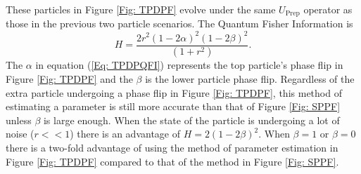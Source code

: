 \documentclass[twocolumn]{article}
\begin{document}
\newpage \par \noindent
These particles in Figure \ref{Fig: TPDPF} evolve under the same $U_{\text{Prep}}$ operator as those in the previous two particle scenarios. The Quantum Fisher Information is
\begin{equation}\label{Eq: TPDPQFI}
H=\frac{2r^2(1-2\alpha)^2(1-2\beta)^2}{(1+r^2)}.
\end{equation}
The $\alpha$ in equation (\ref{Eq: TPDPQFI}) represents the top particle's phase flip in Figure \ref{Fig: TPDPF} and the $\beta$ is the lower particle phase flip. Regardless of the extra particle undergoing a phase flip in Figure \ref{Fig: TPDPF}, this method of estimating a parameter is still more accurate than that of Figure \ref{Fig: SPPF} unless $\beta$ is large enough. When the state of the particle is undergoing a lot of noise ($r<<1$) there is an advantage of $H=2(1-2\beta)^2$. When $\beta=1$ or $\beta=0$ there is a two-fold advantage of using the method of parameter estimation in Figure \ref{Fig: TPDPF} compared to that of the method in Figure \ref{Fig: SPPF}.
\end{document}
